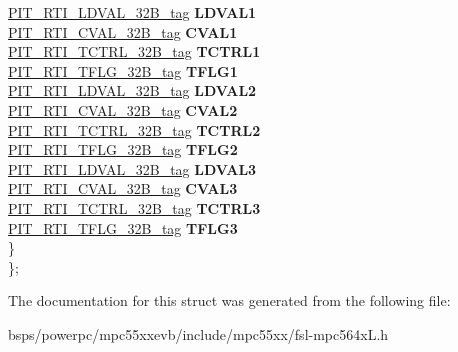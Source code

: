 \begin{DoxyCompactItemize}
\begin{tabbing}
\>\>\mbox{\hyperlink{unionPIT__RTI__LDVAL__32B__tag}{PIT\_RTI\_LDVAL\_32B\_tag}} {\bfseries LDVAL1}\\
\>\>\mbox{\hyperlink{unionPIT__RTI__CVAL__32B__tag}{PIT\_RTI\_CVAL\_32B\_tag}} {\bfseries CVAL1}\\
\>\>\mbox{\hyperlink{unionPIT__RTI__TCTRL__32B__tag}{PIT\_RTI\_TCTRL\_32B\_tag}} {\bfseries TCTRL1}\\
\>\>\mbox{\hyperlink{unionPIT__RTI__TFLG__32B__tag}{PIT\_RTI\_TFLG\_32B\_tag}} {\bfseries TFLG1}\\
\>\>\mbox{\hyperlink{unionPIT__RTI__LDVAL__32B__tag}{PIT\_RTI\_LDVAL\_32B\_tag}} {\bfseries LDVAL2}\\
\>\>\mbox{\hyperlink{unionPIT__RTI__CVAL__32B__tag}{PIT\_RTI\_CVAL\_32B\_tag}} {\bfseries CVAL2}\\
\>\>\mbox{\hyperlink{unionPIT__RTI__TCTRL__32B__tag}{PIT\_RTI\_TCTRL\_32B\_tag}} {\bfseries TCTRL2}\\
\>\>\mbox{\hyperlink{unionPIT__RTI__TFLG__32B__tag}{PIT\_RTI\_TFLG\_32B\_tag}} {\bfseries TFLG2}\\
\>\>\mbox{\hyperlink{unionPIT__RTI__LDVAL__32B__tag}{PIT\_RTI\_LDVAL\_32B\_tag}} {\bfseries LDVAL3}\\
\>\>\mbox{\hyperlink{unionPIT__RTI__CVAL__32B__tag}{PIT\_RTI\_CVAL\_32B\_tag}} {\bfseries CVAL3}\\
\>\>\mbox{\hyperlink{unionPIT__RTI__TCTRL__32B__tag}{PIT\_RTI\_TCTRL\_32B\_tag}} {\bfseries TCTRL3}\\
\>\>\mbox{\hyperlink{unionPIT__RTI__TFLG__32B__tag}{PIT\_RTI\_TFLG\_32B\_tag}} {\bfseries TFLG3}\\
\>\} \\
\}; \\

\end{tabbing}\end{DoxyCompactItemize}


The documentation for this struct was generated from the following file\+:\begin{DoxyCompactItemize}
\item 
bsps/powerpc/mpc55xxevb/include/mpc55xx/fsl-\/mpc564x\+L.\+h\end{DoxyCompactItemize}
